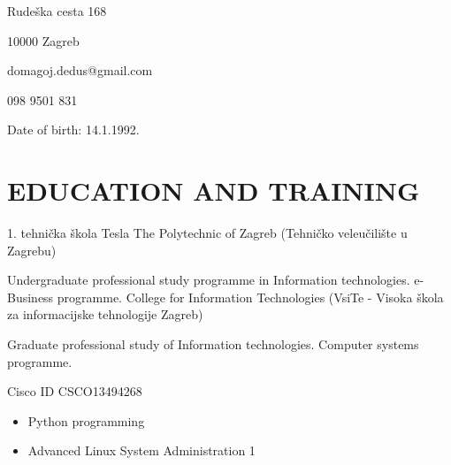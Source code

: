 \documentclass{cv}
\begin{document}

Rudeška cesta 168

10000 Zagreb

domagoj.dedus@gmail.com

098 9501 831

Date of birth: 14.1.1992.
\section{EDUCATION AND TRAINING}
1. tehnička škola Tesla
The Polytechnic of Zagreb (Tehničko veleučilište u Zagrebu)

Undergraduate professional study programme in Information technologies. e-Business programme.
College for Information Technologies (VsiTe - Visoka škola za informacijske tehnologije Zagreb)

Graduate professional study of Information technologies. Computer systems programme.

Cisco ID CSCO13494268
\begin{itemize}
    \setlength\itemsep{0.1cm}
    \item Python programming
    \item Advanced Linux System Administration 1
\end{itemize}
\end{document}
